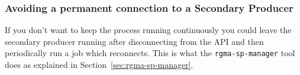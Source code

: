 \subsubsection{Avoiding a permanent connection to a Secondary Producer}
If you don't want to keep the process running continuously you could
leave the secondary producer running after disconnecting from the API
and then periodically run a job which reconnects.  This is what the 
\texttt{rgma-sp-manager} tool does as explained in
Section~\ref{sec:rgma-sp-manager}.
